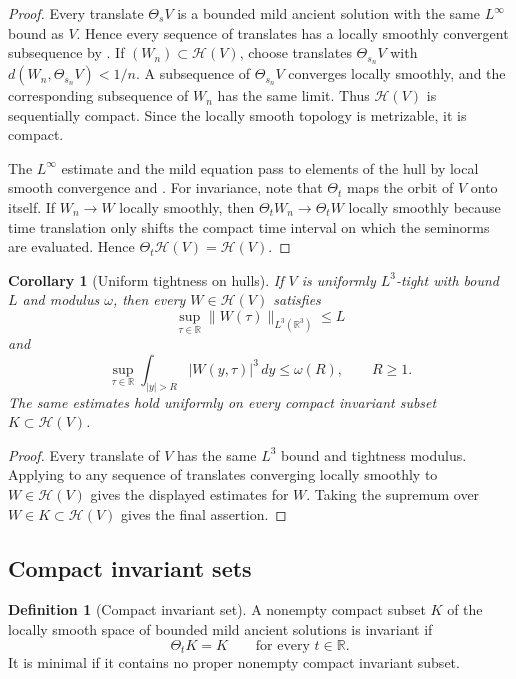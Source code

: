 \documentclass[11pt]{amsart}
\theoremstyle{plain}
\newtheorem{corollary}[corollary]{Corollary}
\theoremstyle{definition}
\newtheorem{definition}[definition]{Definition}
\theoremstyle{remark}
\numberwithin{equation}{section}
\newcommand{\R}{\mathbb R}
\newcommand{\calH}{\mathcal H}
\begin{document}
\begin{proof}
Every translate \(\Theta_sV\) is a bounded mild ancient solution with the same
\(L^\infty\) bound as \(V\).  Hence every sequence of translates has a
locally smoothly convergent subsequence by .
If \((W_n)\subset\calH(V)\), choose translates \(\Theta_{s_n}V\) with
\(d(W_n,\Theta_{s_n}V)<1/n\).  A subsequence of \(\Theta_{s_n}V\) converges
locally smoothly, and the corresponding subsequence of \(W_n\) has the same
limit.  Thus \(\calH(V)\) is sequentially compact.  Since the locally smooth
topology is metrizable, it is compact.

The \(L^\infty\) estimate and the mild equation pass to elements of the hull
by local smooth convergence and .  For invariance, note
that \(\Theta_t\) maps the orbit of \(V\) onto itself.  If \(W_n\to W\)
locally smoothly, then \(\Theta_tW_n\to\Theta_tW\) locally smoothly because
time translation only shifts the compact time interval on which the
seminorms are evaluated.  Hence \(\Theta_t\calH(V)=\calH(V)\).

\end{proof}

\begin{corollary}[Uniform tightness on hulls]\label{p2:cor:tightness-on-hulls}
If \(V\) is uniformly \(L^3\)-tight with bound \(L\) and modulus \(\omega\),
then every \(W\in\calH(V)\) satisfies
\[
   \sup_{\tau\in\R}\|W(\tau)\|_{L^3(\R^3)}\le L
\]
and
\[
   \sup_{\tau\in\R}\int_{|y|>R}|W(y,\tau)|^3\,dy\le\omega(R),
   \qquad R\ge1.
\]
The same estimates hold uniformly on every compact invariant subset
\(K\subset\calH(V)\).
\end{corollary}

\begin{proof}
Every translate of \(V\) has the same \(L^3\) bound and tightness modulus.
Applying  to any sequence of translates converging
locally smoothly to \(W\in\calH(V)\) gives the displayed estimates for \(W\).
Taking the supremum over \(W\in K\subset\calH(V)\) gives the final assertion.
\end{proof}

\subsection{Compact invariant sets}

\begin{definition}[Compact invariant set]\label{p2:def:compact-invariant}
A nonempty compact subset \(K\) of the locally smooth space of bounded mild
ancient solutions is invariant if
\[
   \Theta_tK=K
   \qquad\text{for every }t\in\R .
\]
It is minimal if it contains no proper nonempty compact invariant subset.
\end{definition}
\end{document}

